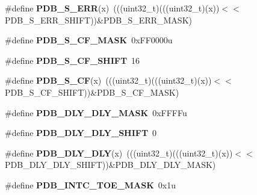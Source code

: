 \begin{DoxyCompactItemize}
\item 
\#define {\bfseries P\+D\+B\+\_\+\+S\+\_\+\+E\+RR}(x)~(((uint32\+\_\+t)(((uint32\+\_\+t)(x))$<$$<$P\+D\+B\+\_\+\+S\+\_\+\+E\+R\+R\+\_\+\+S\+H\+I\+FT))\&P\+D\+B\+\_\+\+S\+\_\+\+E\+R\+R\+\_\+\+M\+A\+SK)\hypertarget{group__PDB__Register__Masks_gae5f66f6b1c641d52cb706ac11428e11d}{}\label{group__PDB__Register__Masks_gae5f66f6b1c641d52cb706ac11428e11d}

\item 
\#define {\bfseries P\+D\+B\+\_\+\+S\+\_\+\+C\+F\+\_\+\+M\+A\+SK}~0x\+F\+F0000u\hypertarget{group__PDB__Register__Masks_gabf6ae593f200a1eda316cd9affa9f5b2}{}\label{group__PDB__Register__Masks_gabf6ae593f200a1eda316cd9affa9f5b2}

\item 
\#define {\bfseries P\+D\+B\+\_\+\+S\+\_\+\+C\+F\+\_\+\+S\+H\+I\+FT}~16\hypertarget{group__PDB__Register__Masks_ga17f0097777c1377488f0bf9654021714}{}\label{group__PDB__Register__Masks_ga17f0097777c1377488f0bf9654021714}

\item 
\#define {\bfseries P\+D\+B\+\_\+\+S\+\_\+\+CF}(x)~(((uint32\+\_\+t)(((uint32\+\_\+t)(x))$<$$<$P\+D\+B\+\_\+\+S\+\_\+\+C\+F\+\_\+\+S\+H\+I\+FT))\&P\+D\+B\+\_\+\+S\+\_\+\+C\+F\+\_\+\+M\+A\+SK)\hypertarget{group__PDB__Register__Masks_gaa9865ff9f9ab4bd805a99b75ee73c7e5}{}\label{group__PDB__Register__Masks_gaa9865ff9f9ab4bd805a99b75ee73c7e5}

\item 
\#define {\bfseries P\+D\+B\+\_\+\+D\+L\+Y\+\_\+\+D\+L\+Y\+\_\+\+M\+A\+SK}~0x\+F\+F\+F\+Fu\hypertarget{group__PDB__Register__Masks_ga79150887ba3f74efde99b40d3b9c5e44}{}\label{group__PDB__Register__Masks_ga79150887ba3f74efde99b40d3b9c5e44}

\item 
\#define {\bfseries P\+D\+B\+\_\+\+D\+L\+Y\+\_\+\+D\+L\+Y\+\_\+\+S\+H\+I\+FT}~0\hypertarget{group__PDB__Register__Masks_ga431302f6c6fd1396cbb05844f864d241}{}\label{group__PDB__Register__Masks_ga431302f6c6fd1396cbb05844f864d241}

\item 
\#define {\bfseries P\+D\+B\+\_\+\+D\+L\+Y\+\_\+\+D\+LY}(x)~(((uint32\+\_\+t)(((uint32\+\_\+t)(x))$<$$<$P\+D\+B\+\_\+\+D\+L\+Y\+\_\+\+D\+L\+Y\+\_\+\+S\+H\+I\+FT))\&P\+D\+B\+\_\+\+D\+L\+Y\+\_\+\+D\+L\+Y\+\_\+\+M\+A\+SK)\hypertarget{group__PDB__Register__Masks_ga39781873dd40fb95e69b65d323ab49bf}{}\label{group__PDB__Register__Masks_ga39781873dd40fb95e69b65d323ab49bf}

\item 
\#define {\bfseries P\+D\+B\+\_\+\+I\+N\+T\+C\+\_\+\+T\+O\+E\+\_\+\+M\+A\+SK}~0x1u\hypertarget{group__PDB__Register__Masks_ga72fcf50548a0ad908e68c9dd67e61c2a}{}\label{group__PDB__Register__Masks_ga72fcf50548a0ad908e68c9dd67e61c2a}


\end{DoxyCompactItemize}
